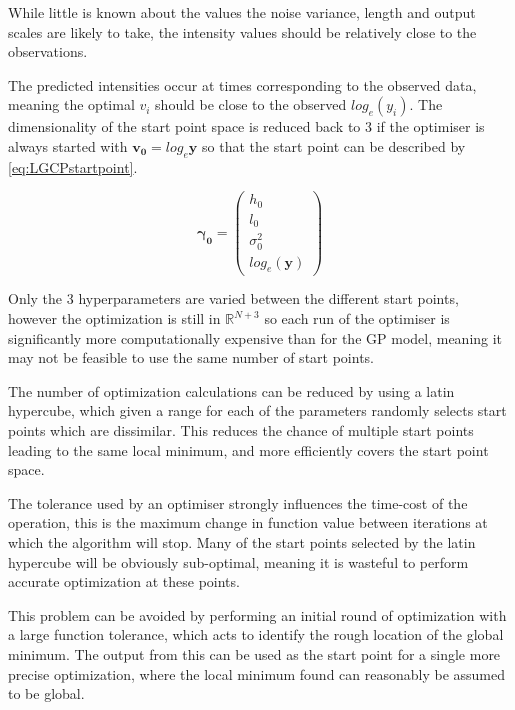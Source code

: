\documentclass[a4paper,11pt]{report}
\begin{document}
While little is known about the values the noise variance, length and output scales are likely to take, the intensity values should be relatively close to the observations. 

The predicted intensities occur at times corresponding to the observed data, meaning the optimal \(v_i\) should be close to the observed \(log_e(y_i)\). The dimensionality of the start point space is reduced back to 3 if the optimiser is always started with \(\mathbf{v_0} = log_e \mathbf{y}\) so that the start point can be described by \ref{eq:LGCPstartpoint}. 


\begin{equation} \label{eq:LGCPstartpoint}
\boldsymbol{\gamma_0} = \left( \begin{array}{cc}
h_0 \\
l_0 \\
\sigma^2_0 \\
log_e(\mathbf{y}) \end{array} \right) 
\end{equation}

Only the 3 hyperparameters are varied between the different start points, however the optimization is still in \(\mathds{R}^{N+3}\) so each run of the optimiser is significantly more computationally expensive than for the GP model, meaning it may not be feasible to use the same number of start points.  \par

The number of optimization calculations can be reduced by using a latin hypercube, which given a range for each of the parameters randomly selects start points which are dissimilar. \cite{latin-hyper} This reduces the chance of multiple start points leading to the same local minimum, and more efficiently covers the start point space. \par

The tolerance used by an optimiser strongly influences the time-cost of the operation, this is the maximum change in function value between iterations at which the algorithm will stop. Many of the start points selected by the latin hypercube will be obviously sub-optimal, meaning it is wasteful to perform accurate optimization at these points. \par

This problem can be avoided by performing an initial round of optimization with a large function tolerance, which acts to identify the rough location of the global minimum. The output from this can be used as the start point for a single more precise optimization, where the local minimum found can reasonably be assumed to be global.
\end{document}

